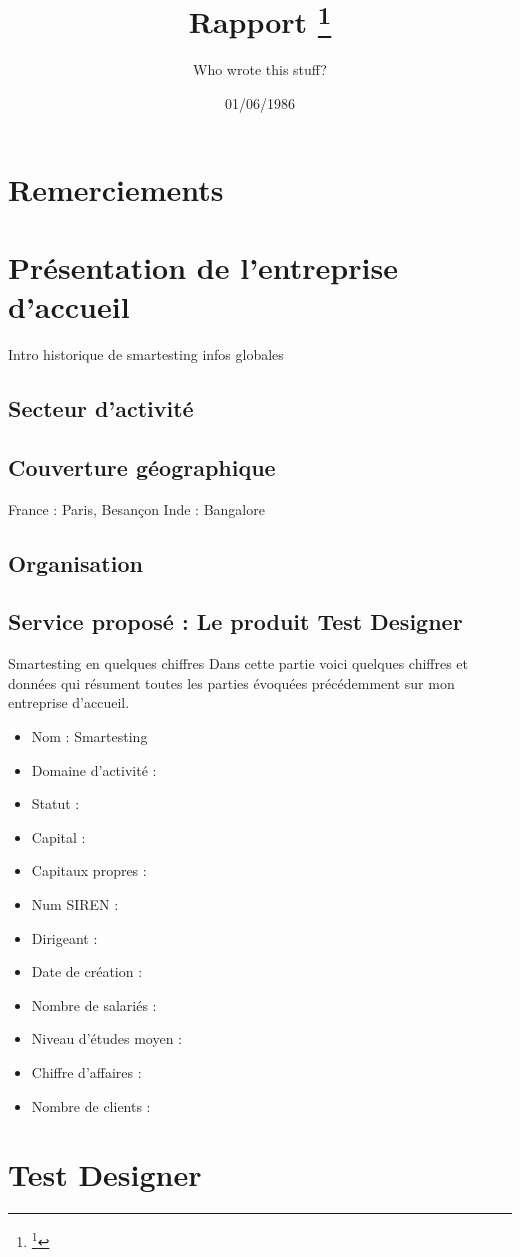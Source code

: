 \documentclass{article}
\title{Rapport
	\footnote{\thanks{A special form of footnote}}}
\author{Who wrote this stuff?}
\date{01/06/1986}
\begin{document}
\section{Remerciements}

\section{Présentation de l'entreprise d'accueil}
Intro historique de smartesting infos globales
\subsection{Secteur d'activité}

\subsection{Couverture géographique}
France : Paris, Besançon
Inde : Bangalore

\subsection{Organisation}

\subsection{Service proposé : Le produit Test Designer}
Smartesting en quelques chiffres
Dans cette partie voici quelques chiffres et données qui résument toutes les parties évoquées précédemment sur mon entreprise d'accueil.
\begin{itemize}
\item{Nom : Smartesting} 
\item{Domaine d'activité :} 
\item{Statut :} 
\item{Capital :} 
\item{Capitaux propres :} 
\item{Num SIREN :} 
\item{Dirigeant :} 
\item{Date de création : } 
\item{Nombre de salariés :} 
\item{Niveau d'études moyen :} 
\item{Chiffre d'affaires :} 
\item{Nombre de clients :} 
\end{itemize}

\section{Test Designer}
\end{document}
